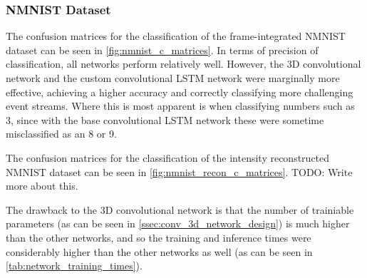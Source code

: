 \subsubsection{NMNIST Dataset}

The confusion matrices for the classification of the frame-integrated  NMNIST dataset can be seen in \cref{fig:nmnist_c_matrices}. In terms of precision of classification, all networks perform relatively well. However, the 3D convolutional network and the custom convolutional LSTM network were marginally more effective, achieving a higher accuracy and correctly classifying more challenging event streams. Where this is most apparent is when classifying numbers such as 3, since with the base convolutional LSTM network these were sometime misclassified as an 8 or 9.

The confusion matrices for the classification of the intensity reconstructed NMNIST dataset can be seen in \cref{fig:nmnist_recon_c_matrices}. \color{red} TODO: Write more about this. \color{black}

The drawback to the 3D convolutional network is that the number of trainiable parameters (as can be seen in \cref{ssec:conv_3d_network_design}) is much higher than the other networks, and so the training and inference times were considerably higher than the other networks as well (as can be seen in \cref{tab:network_training_times}).

